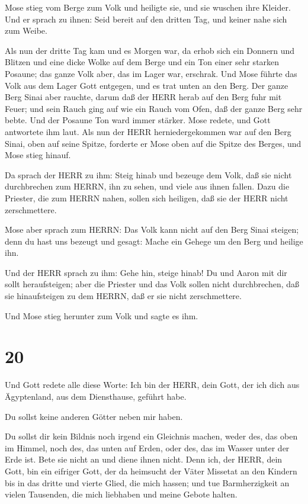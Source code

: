  Mose stieg vom Berge zum Volk und heiligte sie, und sie
wuschen ihre Kleider.  Und er sprach zu ihnen: Seid bereit
auf den dritten Tag, und keiner nahe sich zum Weibe.

 Als nun der dritte Tag kam und es Morgen war, da erhob
sich ein Donnern und Blitzen und eine dicke Wolke auf dem Berge und ein
Ton einer sehr starken Posaune; das ganze Volk aber, das im Lager war,
erschrak.  Und Mose führte das Volk aus dem Lager Gott
entgegen, und es trat unten an den Berg.  Der ganze Berg
Sinai aber rauchte, darum daß der HERR herab auf den Berg fuhr mit
Feuer; und sein Rauch ging auf wie ein Rauch vom Ofen, daß der ganze
Berg sehr bebte.  Und der Posaune Ton ward immer stärker.
Mose redete, und Gott antwortete ihm laut.  Als nun der
HERR herniedergekommen war auf den Berg Sinai, oben auf seine Spitze,
forderte er Mose oben auf die Spitze des Berges, und Mose stieg hinauf.

 Da sprach der HERR zu ihm: Steig hinab und bezeuge dem
Volk, daß sie nicht durchbrechen zum HERRN, ihn zu sehen, und viele aus
ihnen fallen.  Dazu die Priester, die zum HERRN nahen,
sollen sich heiligen, daß sie der HERR nicht zerschmettere.

 Mose aber sprach zum HERRN: Das Volk kann nicht auf den
Berg Sinai steigen; denn du hast uns bezeugt und gesagt: Mache ein
Gehege um den Berg und heilige ihn.

 Und der HERR sprach zu ihm: Gehe hin, steige hinab! Du und
Aaron mit dir sollt heraufsteigen; aber die Priester und das Volk sollen
nicht durchbrechen, daß sie hinaufsteigen zu dem HERRN, daß er sie nicht
zerschmettere.

 Und Mose stieg herunter zum Volk und sagte es ihm.

\hypertarget{section-19}{%
\section{20}\label{section-19}}

 Und Gott redete alle diese Worte:  Ich bin der
HERR, dein Gott, der ich dich aus Ägyptenland, aus dem Diensthause,
geführt habe.

 Du sollst keine anderen Götter neben mir haben.

 Du sollst dir kein Bildnis noch irgend ein Gleichnis
machen, weder des, das oben im Himmel, noch des, das unten auf Erden,
oder des, das im Wasser unter der Erde ist.  Bete sie nicht
an und diene ihnen nicht. Denn ich, der HERR, dein Gott, bin ein
eifriger Gott, der da heimsucht der Väter Missetat an den Kindern bis in
das dritte und vierte Glied, die mich hassen;  und tue
Barmherzigkeit an vielen Tausenden, die mich liebhaben und meine Gebote
halten.

